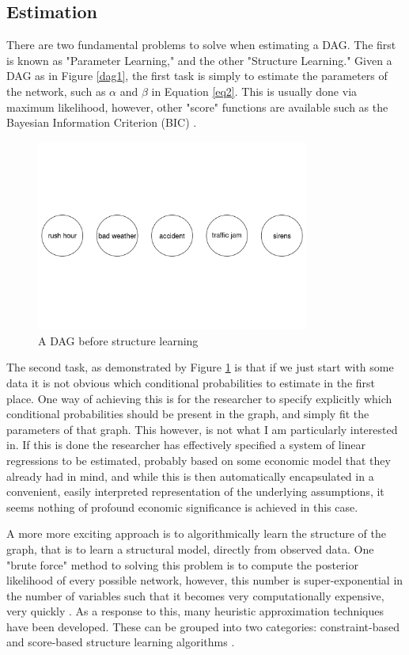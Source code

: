 \documentclass{article}
\begin{document}
\subsection{Estimation}

There are two fundamental problems to solve when estimating a DAG. The first is known as "Parameter Learning," and the other "Structure Learning." Given a DAG as in Figure \ref{dag1}, the first task is simply to estimate the parameters of the network, such as $\alpha$ and $\beta$ in Equation \ref{eq2}. This is usually done via maximum likelihood, however, other "score" functions are available such as the Bayesian Information Criterion (BIC) \parencite{chen1998speaker}.

\begin{figure}
  \centering
  \includegraphics[width=0.8\textwidth]{images/trafficjam_unfit.png}
  \caption{A DAG before structure learning}
  \label{dag2}
\end{figure}

The second task, as demonstrated by Figure \ref{dag2} is that if we just start with some data it is not obvious which conditional probabilities to estimate in the first place. One way of achieving this is for the researcher to specify explicitly which conditional probabilities should be present in the graph, and simply fit the parameters of that graph. This however, is not what I am particularly interested in. If this is done the researcher has effectively specified a system of linear regressions to be estimated, probably based on some economic model that they already had in mind, and while this is then automatically encapsulated in a convenient, easily interpreted representation of the underlying assumptions, it seems nothing of profound economic significance is achieved in this case. 

A more more exciting approach is to algorithmically learn the structure of the graph, that is to learn a structural model, directly from observed data. One "brute force" method to solving this problem is to compute the posterior likelihood of every possible network, however, this number is super-exponential in the number of variables such that it becomes very computationally expensive, very quickly \parencite{chickering1996learning}. As a response to this, many heuristic approximation techniques have been developed. These can be grouped into two categories: constraint-based and score-based structure learning algorithms \parencite{spirtes1991algorithm} \parencite{verma1991equivalence}. 
\end{document}
